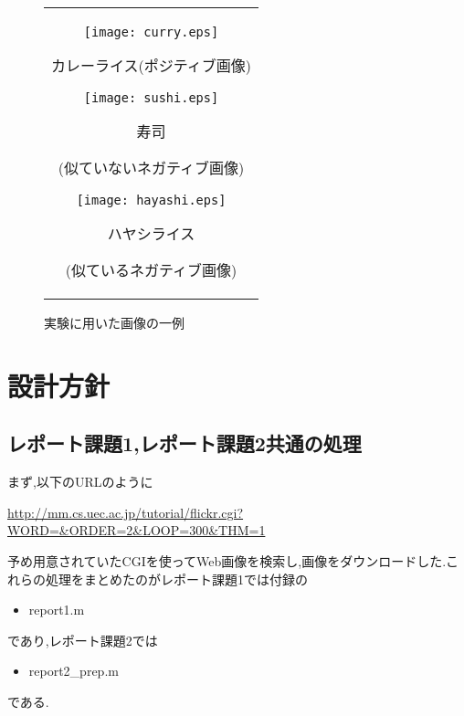\documentclass[11pt,a4j]{jreport}
\begin{document}
\begin{figure}[htbp]
  \begin{center}
    \begin{tabular}{c}
      \begin{minipage}{0.35\hsize}
        \begin{center}
    \texttt{[image: curry.eps]}
        \end{center}
        カレーライス(ポジティブ画像)
      \end{minipage}
      \begin{minipage}{0.35\hsize}
        \begin{center}
          \texttt{[image: sushi.eps]}
        \end{center}
       \hspace{2.0cm} 寿司

       (似ていないネガティブ画像)
      \end{minipage}
      \begin{minipage}{0.35\hsize}
        \begin{center}
          \texttt{[image: hayashi.eps]}
        \end{center}
       \hspace{1.7cm} ハヤシライス

        \hspace{0.8cm}(似ているネガティブ画像)
      \end{minipage}
    \end{tabular}
    \caption{実験に用いた画像の一例}
  \end{center}
\end{figure}
\newpage
\section{設計方針}
\subsection{レポート課題1,レポート課題2共通の処理}
まず,以下のURLのように

\url{http://mm.cs.uec.ac.jp/tutorial/flickr.cgi?WORD=&ORDER=2&LOOP=300&THM=1}

予め用意されていたCGIを使ってWeb画像を検索し,画像をダウンロードした.これらの処理をまとめたのがレポート課題1では付録の

\begin{itemize}
\item report1.m
\end{itemize}
であり,レポート課題2では
\begin{itemize}
  \item report2\_prep.m
\end{itemize}
である.
\end{document}
